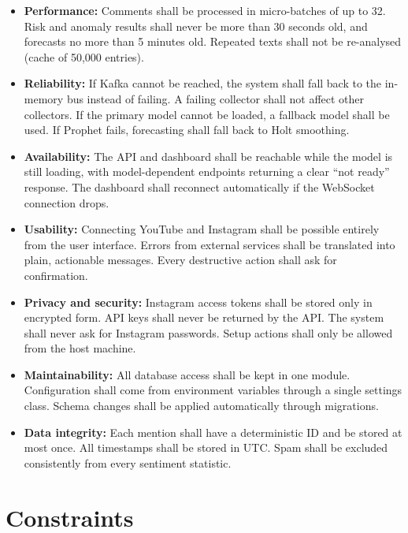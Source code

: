 \documentclass[12pt,a4paper]{report}
\begin{document}
\begin{itemize}
    \item \textbf{Performance:} Comments shall be processed in micro-batches of up to 32. Risk and anomaly results shall never be more than 30 seconds old, and forecasts no more than 5 minutes old. Repeated texts shall not be re-analysed (cache of 50,000 entries).
    \item \textbf{Reliability:} If Kafka cannot be reached, the system shall fall back to the in-memory bus instead of failing. A failing collector shall not affect other collectors. If the primary model cannot be loaded, a fallback model shall be used. If Prophet fails, forecasting shall fall back to Holt smoothing.
    \item \textbf{Availability:} The API and dashboard shall be reachable while the model is still loading, with model-dependent endpoints returning a clear ``not ready'' response. The dashboard shall reconnect automatically if the WebSocket connection drops.
    \item \textbf{Usability:} Connecting YouTube and Instagram shall be possible entirely from the user interface. Errors from external services shall be translated into plain, actionable messages. Every destructive action shall ask for confirmation.
    \item \textbf{Privacy and security:} Instagram access tokens shall be stored only in encrypted form. API keys shall never be returned by the API. The system shall never ask for Instagram passwords. Setup actions shall only be allowed from the host machine.
    \item \textbf{Maintainability:} All database access shall be kept in one module. Configuration shall come from environment variables through a single settings class. Schema changes shall be applied automatically through migrations.
    \item \textbf{Data integrity:} Each mention shall have a deterministic ID and be stored at most once. All timestamps shall be stored in UTC. Spam shall be excluded consistently from every sentiment statistic.
\end{itemize}

\section{Constraints}
\end{document}
